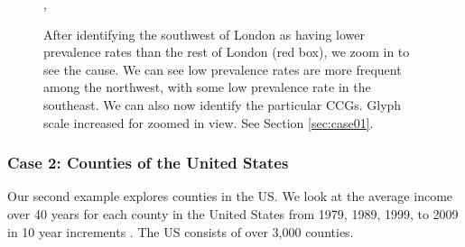 \begin{figure}[t]
,
\caption{After identifying the southwest of London as having lower prevalence rates than the rest of London (red box), we zoom in to see the cause. We can see low prevalence rates are more frequent among the northwest, with some low prevalence rate in the southeast. We can also now identify the particular CCGs. Glyph scale increased for zoomed in view. See Section \ref{sec:case01}.} \label{fig:case01}
\end{figure}


\subsubsection{Case 2: Counties of the United States} \label{sec:case02} 
Our second example explores counties in the US. We look at the average income over 40 years for each county in the United States from 1979, 1989, 1999, to 2009 in 10 year increments \cite{usCounties}. The US consists of over 3,000 counties.

